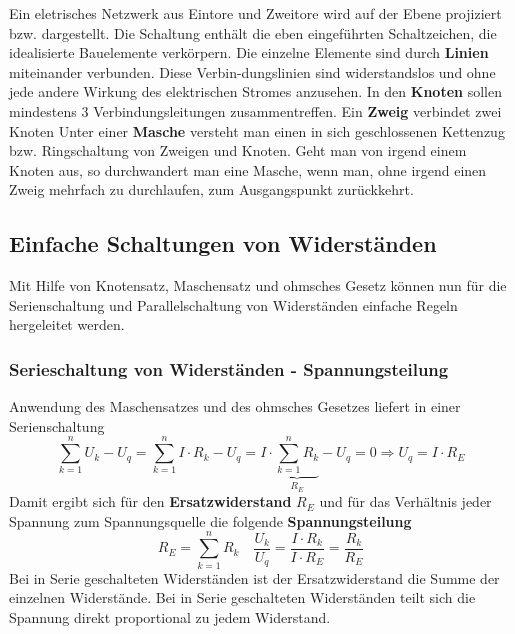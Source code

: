 \noindent Ein eletrisches Netzwerk aus Eintore und Zweitore wird auf der Ebene projiziert bzw. dargestellt. Die Schaltung enthält die eben eingeführten Schaltzeichen, die idealisierte Bauelemente verkörpern.
\newline\newline
Die einzelne Elemente sind durch \textbf{Linien} miteinander verbunden. Diese Verbin-dungslinien sind widerstandslos und ohne jede andere Wirkung des elektrischen Stromes anzusehen.
\newline\newline
In den \textbf{Knoten} sollen mindestens 3 Verbindungsleitungen zusammentreffen. Ein \textbf{Zweig} verbindet zwei Knoten
\newline\newline
Unter einer \textbf{Masche} versteht man einen in sich geschlossenen Kettenzug bzw. Ringschaltung von Zweigen und Knoten. Geht man von irgend einem Knoten aus, so durchwandert man eine Masche, wenn man, ohne irgend einen Zweig mehrfach zu durchlaufen, zum Ausgangspunkt zurückkehrt.
\subsection{Einfache Schaltungen von Widerständen}
Mit Hilfe von Knotensatz, Maschensatz und ohmsches Gesetz können nun für die Serienschaltung und Parallelschaltung von Widerständen einfache Regeln hergeleitet werden.
\subsubsection{Serieschaltung von Widerständen - Spannungsteilung}
Anwendung des Maschensatzes und des ohmsches Gesetzes liefert in einer Serienschaltung
\begin{equation}
\boxed{\displaystyle \sum_{k=1}^nU_k-U_q=\displaystyle \sum_{k=1}^nI\cdot R_k-U_q=I\cdot \underbrace{\displaystyle \sum_{k=1}^nR_k}_{R_E}-U_q=0\Longrightarrow U_q=I\cdot R_E}
\end{equation}
Damit ergibt sich für den \textbf{Ersatzwiderstand} $R_E$ und für das Verhältnis jeder Spannung zum Spannungsquelle die folgende \textbf{Spannungsteilung}
\begin{equation}
\boxed{R_E=\displaystyle \sum_{k=1}^nR_k}\quad \boxed{\dfrac{U_k}{U_q}=\dfrac{I\cdot R_k}{I\cdot R_E}=\dfrac{R_k}{R_E}}
\end{equation}
Bei in Serie geschalteten Widerständen ist der Ersatzwiderstand die Summe der einzelnen Widerstände. Bei in Serie geschalteten Widerständen teilt sich die Spannung direkt proportional zu jedem Widerstand.
